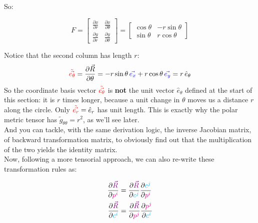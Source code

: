 So:

\begin{equation}
    F =
    \begin{bmatrix}
        \frac{\partial x}{\partial r} & \frac{\partial x}{\partial \theta}\\
        \frac{\partial y}{\partial r} & \frac{\partial y}{\partial \theta}
    \end{bmatrix} = 
    \begin{bmatrix}
        \cos\theta & -r\sin\theta\\
        \sin\theta & r\cos\theta
    \end{bmatrix}
\end{equation}

Notice that the second column has length $r$:
\[
\begingroup\color{red}\tilde{\vec{e_\theta}}\endgroup = \frac{\partial \vec{R}}{\partial \theta}
= -r\sin\theta\,\begingroup\color{blue}\vec{e_x}\endgroup + r\cos\theta\,\begingroup\color{blue}\vec{e_y}\endgroup
= r\,\hat{e}_\theta
\]
So the coordinate basis vector $\begingroup\color{red}\tilde{\vec{e_\theta}}\endgroup$ is \textbf{not} the unit vector $\hat{e}_\theta$
defined at the start of this section: it is $r$ times longer, because a unit change in $\theta$ moves us a distance $r$ along the circle.
Only $\begingroup\color{red}\tilde{\vec{e_r}}\endgroup = \hat{e}_r$ has unit length. This is exactly why the polar metric tensor has
$\tilde{g}_{\theta\theta} = r^2$, as we'll see later.\\

And you can tackle, with the same derivation logic, the inverse Jacobian matrix, of backward transformation 
matrix, to obviously find out that the multiplication of the two yields the identity matrix.\\

Now, following a more tensorial approach, we can also re-write these transformation rules as:

\begin{align*}
    \frac{\partial \begingroup\color{violet}\vec{R}\endgroup}{\partial \begingroup\color{magenta}p^i\endgroup} &= \frac{\partial \begingroup\color{violet}\vec{R}\endgroup}{\partial \begingroup\color{cyan}c^j\endgroup}\frac{\partial \begingroup\color{cyan}c^j\endgroup}{\partial \begingroup\color{magenta}p^i\endgroup} \\
    \frac{\partial \begingroup\color{violet}\vec{R}\endgroup}{\partial \begingroup\color{cyan}c^i\endgroup} &= \frac{\partial \begingroup\color{violet}\vec{R}\endgroup}{\partial \begingroup\color{magenta}p^j\endgroup}\frac{\partial \begingroup\color{magenta}p^j\endgroup}{\partial \begingroup\color{cyan}c^i\endgroup} 
\end{align*}


